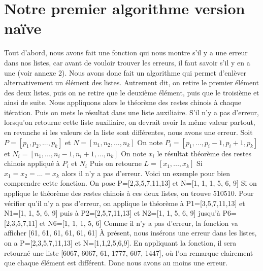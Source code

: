 \documentclass[a4paper, 11pt]{report}
\begin{document}
\section{Notre premier algorithme version naïve }
Tout d'abord, nous avons fait une fonction qui nous montre s'il y a une erreur dans nos listes, car avant de vouloir trouver les erreurs, il faut savoir s'il y en a une (voir annexe 2).
Nous avons donc fait un algorithme qui permet d'enlèver alternativement un élément des listes. Autrement dit, on retire le premier élément des deux listes, puis on ne retire que le deuxième élément, puis que le troisième et ainsi de suite. Nous appliquons alors le théorème des restes chinois à chaque itération. Puis on mets le résultat dans une liste auxiliaire. S'il n'y a pas d'erreur,
lorsqu'on retourne cette liste auxiliaire, on devrait avoir la même valeur partout, en revanche si les valeurs de la liste sont différentes, nous avons une erreur. \newline
\newline
Soit $P=[p_1 , p_2, ... , p_k]$ et $N=[n_1, n_2, ..., n_k]$ \newline
On note $P_i = [p_1,..., p_i-1, p_i+1, p_k]$ et $N_i=[n_1,..., n_i-1, n_i+1, ... , n_k]$ \newline
On note $x_i$ le résultat théorème des restes chinois appliqué à $P_i$ et $N_i$ \newline
Puis on retourne 
$L=[x_1, ..., x_k]$ \newline
Si 
$x_1=x_2=...=x_k$ 
alors il n'y a pas d'erreur. \newline
\newline
Voici un exemple pour bien comprendre cette fonction.\newline
On pose P=[2,3,5,7,11,13] et N=[1, 1, 1, 5, 6, 9] \newline
Si on applique le théorème des restes chinois à ces deux listes, on trouve 510510. Pour vérifier qu'il n'y a pas d'erreur, on applique le théorème à
P1=[3,5,7,11,13] et N1=[1, 1, 5, 6, 9] puis à P2=[2,5,7,11,13] et N2=[1, 1, 5, 6, 9] jusqu'à P6=[2,3,5,7,11] et N6=[1, 1, 1, 5, 6]\newline
Comme il n'y a pas d'erreur, la fonction va afficher [61, 61, 61, 61, 61, 61] \newline
À présent, nous insérons une erreur dans les listes, on a P=[2,3,5,7,11,13] et N=[1,1,2,5,6,9]. En appliquant la fonction, il sera retourné une liste [6067, 6067, 61, 1777, 607, 1447], où l'on remarque clairement que chaque élément est différent. Donc nous avons au moins une erreur.
\end{document}
